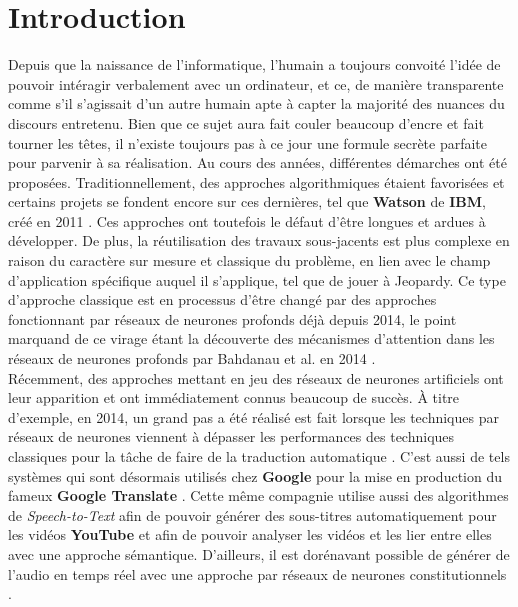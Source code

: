 \section{Introduction}

Depuis que la naissance de l'informatique, l'humain a toujours convoité l'idée de pouvoir intéragir verbalement avec un ordinateur, et ce, de manière transparente comme s'il s'agissait d'un autre humain apte à capter la majorité des nuances du discours entretenu. Bien que ce sujet aura fait couler beaucoup d'encre et fait tourner les têtes, il n'existe toujours pas à ce jour une formule secrète parfaite pour parvenir à sa réalisation. Au cours des années, différentes démarches ont été proposées. Traditionnellement, des approches algorithmiques étaient favorisées et certains projets se fondent encore sur ces dernières, tel que \textbf{Watson} de \textbf{IBM}, créé en 2011 \cite{ibmWatson}. Ces approches ont toutefois le défaut d'être longues et ardues à développer. De plus, la réutilisation des travaux sous-jacents est plus complexe en raison du caractère sur mesure et classique du problème, en lien avec le champ d'application spécifique auquel il s'applique, tel que de jouer à Jeopardy. Ce type d'approche classique est en processus d'être changé par des approches fonctionnant par réseaux de neurones profonds déjà depuis 2014, le point marquand de ce virage étant la découverte des mécanismes d'attention dans les réseaux de neurones profonds par Bahdanau et al. en 2014 \cite{attentionMechanism}.  \\

Récemment, des approches mettant en jeu des réseaux de neurones artificiels ont leur apparition et ont immédiatement connus beaucoup de succès. À titre d'exemple, en 2014, un grand pas a été réalisé est fait lorsque les techniques par réseaux de neurones viennent à dépasser les performances des techniques classiques pour la tâche de faire de la traduction automatique \cite{attentionMechanism}. C’est aussi de tels systèmes qui sont désormais utilisés chez \textbf{Google} pour la mise en production du fameux \textbf{Google Translate} \cite{googleTranslate}. Cette même compagnie utilise aussi des algorithmes de \textit{Speech-to-Text} afin de pouvoir générer des sous-titres automatiquement pour les vidéos \textbf{YouTube} et afin de pouvoir analyser les vidéos et les lier entre elles avec une approche sémantique.
D’ailleurs, il est dorénavant possible de générer de l’audio en temps réel avec une approche par réseaux de neurones constitutionnels \cite{wavenet}. \\

